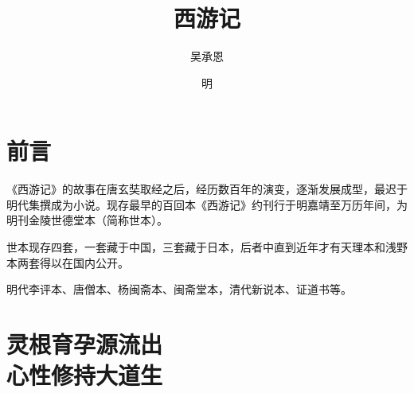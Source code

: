 \documentclass[a4paper,12pt,UTF8,twoside]{ctexbook}
\title{\heiti\zihao{0} 西游记}
\author{吴承恩}
\date{明}
\begin{document}
\maketitle
\tableofcontents

\frontmatter

\chapter{前言}

《西游记》的故事在唐玄奘取经之后，经历数百年的演变，逐渐发展成型，最迟于明代集撰成为小说。现存最早的百回本《西游记》约刊行于明嘉靖至万历年间，为明刊金陵世德堂本（简称世本）。

世本现存四套，一套藏于中国，三套藏于日本，后者中直到近年才有天理本和浅野本两套得以在国内公开。

明代李评本、唐僧本、杨闽斋本、闽斋堂本，清代新说本、证道书等。

\mainmatter

\chapter[灵根育孕源流出\ 心性修持大道生]{灵根育孕源流出\\心性修持大道生}
\end{document}
